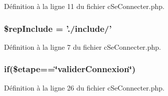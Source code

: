 Définition à la ligne 11 du fichier c\-Se\-Connecter.\-php.

\hypertarget{c_se_connecter_8php_aad2a80747c2de66b59cb18d493ae7a8b}{
\subsubsection[{\$rep\-Include}]{\setlength{\rightskip}{0pt plus 5cm}\$rep\-Include = './include/'}}\label{c_se_connecter_8php_aad2a80747c2de66b59cb18d493ae7a8b}


Définition à la ligne 7 du fichier c\-Se\-Connecter.\-php.

\hypertarget{c_se_connecter_8php_a161e098d41499c163a94c3fa5cd0e698}{
\subsubsection[{if}]{\setlength{\rightskip}{0pt plus 5cm}if(\$etape==\char`\"{}valider\-Connexion\char`\"{})}}\label{c_se_connecter_8php_a161e098d41499c163a94c3fa5cd0e698}


Définition à la ligne 26 du fichier c\-Se\-Connecter.\-php.

